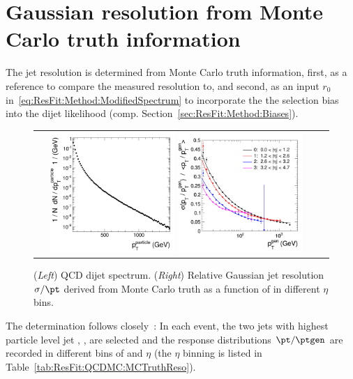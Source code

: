 \appendix


\section{Gaussian resolution from Monte Carlo truth information}\label{sec:ResFit:QCDMC:MCTruthReso}

The jet \pt resolution is determined from Monte Carlo truth information, first, as a reference to compare the measured resolution to, and second, as an input $r_{0}$ in~\eqref{eq:ResFit:Method:ModifiedSpectrum} to incorporate the the selection bias into the dijet likelihood (comp. Section~\ref{sec:ResFit:Method:Biases}).
\begin{figure}[ht]
  \centering
  \begin{tabular}{cc}
    \includegraphics[width=0.45\textwidth]{figures/resFit_QCD_MCSpectrum}
    \includegraphics[width=0.45\textwidth]{figures/resFit_QCD_MCTruthResolution}
  \end{tabular}
  \caption{(\textit{Left}) QCD dijet \ptgen spectrum. (\textit{Right}) Relative Gaussian jet \pt resolution $\sigma/\pt$ derived from Monte Carlo truth as a function of \pt in different $\eta$ bins.}
  \label{fig:ResFit:QCDMC:MCTruthReso}
\end{figure}
The determination follows closely~\cite{bib:cmsan:mcjer}:
In each event, the two jets with highest particle level jet \pt, \ptgen, are selected and the response distributions \mbox{$\pt / \ptgen$} are recorded in different bins of \ptgen and $\eta$ (the $\eta$ binning is listed in Table~\ref{tab:ResFit:QCDMC:MCTruthReso}).

